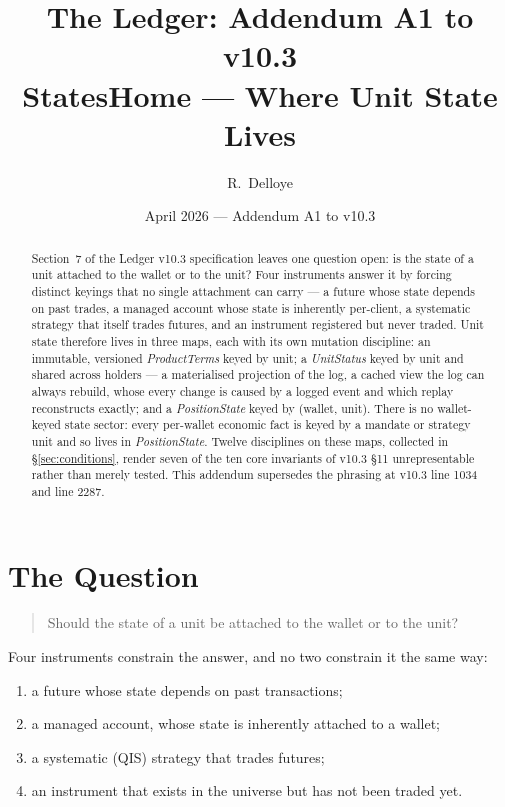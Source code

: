 \documentclass[11pt,a4paper]{article}
\title{The Ledger: Addendum A1 to v10.3\\[6pt]
\large StatesHome --- Where Unit State Lives}
\author{R.\ Delloye}
\date{April 2026 --- Addendum A1 to v10.3}
\begin{document}
\maketitle

\begin{abstract}
Section~7 of the Ledger v10.3 specification leaves one question open: is the state of a
unit attached to the wallet or to the unit? Four instruments answer it by forcing distinct
keyings that no single attachment can carry --- a future whose state depends on past
trades, a managed account whose state is inherently per-client, a systematic strategy that
itself trades futures, and an instrument registered but never traded. Unit state therefore
lives in three maps, each with its own mutation discipline: an immutable, versioned
\emph{ProductTerms} keyed by unit; a \emph{UnitStatus} keyed by unit and shared
across holders --- a materialised projection of the log, a cached view the log can always
rebuild, whose every change is caused by a logged event and which replay reconstructs
exactly; and a \emph{PositionState} keyed by (wallet, unit). There is no
wallet-keyed state sector: every per-wallet economic fact is keyed by a mandate or strategy
unit and so lives in \emph{PositionState}. Twelve disciplines on these maps, collected in
\S\ref{sec:conditions}, render seven of the ten core invariants of v10.3 \S 11
unrepresentable rather than merely tested. This addendum supersedes the phrasing at v10.3
line 1034 and line 2287.
\end{abstract}

\tableofcontents
\clearpage

\section{The Question}
\label{sec:question}

\begin{quote}
Should the state of a unit be attached to the wallet or to the unit?
\end{quote}

\noindent Four instruments constrain the answer, and no two constrain it the same way:

\begin{enumerate}[leftmargin=*]
\item a future whose state depends on past transactions;
\item a managed account, whose state is inherently attached to a wallet;
\item a systematic (QIS) strategy that trades futures;
\item an instrument that exists in the universe but has not been traded yet.
\end{enumerate}
\end{document}
